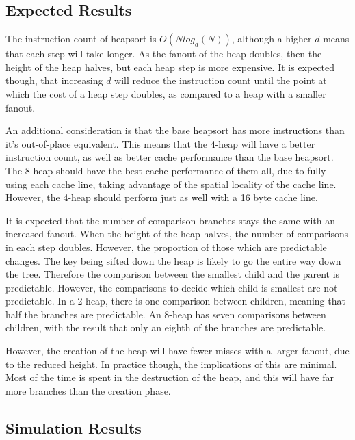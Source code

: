 \subsection{Expected Results}
The instruction count of heapsort is $O(Nlog_d(N))$, although a higher $d$ means
that each step will take longer. As the fanout of the heap doubles, then the
height of the heap halves, but each heap step is more expensive. It is expected
though, that increasing $d$ will reduce the instruction count until the point at
which the cost of a heap step doubles, as compared to a heap with a smaller
fanout.

An additional consideration is that the base heapsort has more instructions than
it's out-of-place equivalent. This means that the 4-heap will have a better
instruction count, as well as better cache performance than the base heapsort.
The 8-heap should have the best cache performance of them all, due to fully
using each cache line, taking advantage of the spatial locality of the cache
line. However, the 4-heap should perform just as well with a 16 byte cache line.

It is expected that the number of comparison branches stays the same with
an increased fanout. When the height of the heap halves, the number of
comparisons in each step doubles. However, the proportion of those which are
predictable changes. The key being sifted down the heap is likely to go the
entire way down the tree. Therefore the comparison between the smallest child
and the parent is predictable. However, the comparisons to decide which child is
smallest are not predictable. In a 2-heap, there is one comparison between
children, meaning that half the branches are predictable. An 8-heap has seven
comparisons between children, with the result that only an eighth of the branches
are predictable.

However, the creation of the heap will have fewer misses with a larger fanout,
due to the reduced height. In practice though, the implications of this are
minimal. Most of the time is spent in the destruction of the heap, and this will
have far more branches than the creation phase.

\subsection{Simulation Results}


